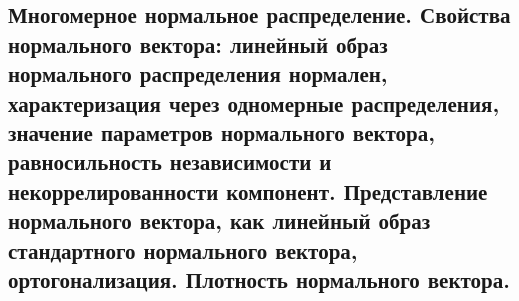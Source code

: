 \subsection{Многомерное нормальное распределение. Свойства нормального вектора: линейный образ нормального распределения нормален, характеризация через одномерные распределения, значение параметров нормального вектора, равносильность независимости и некоррелированности компонент. Представление нормального вектора, как линейный образ стандартного нормального вектора, ортогонализация. Плотность нормального вектора.}